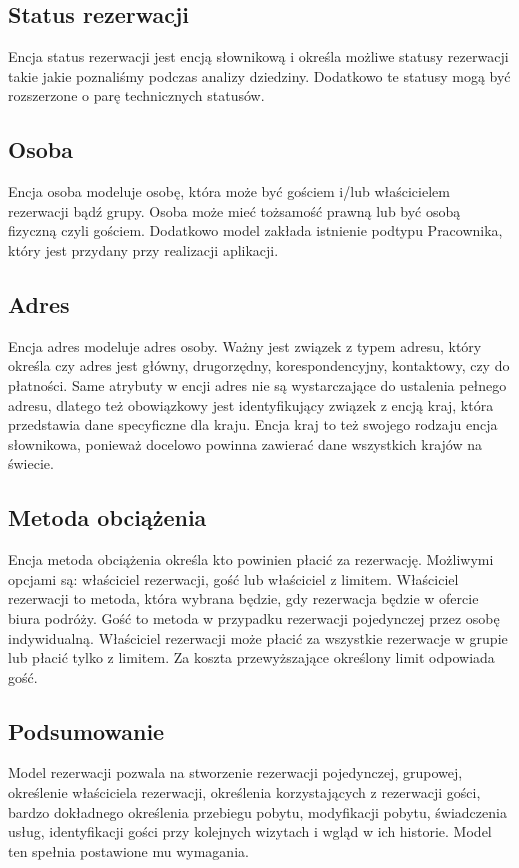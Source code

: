 \documentclass[a4paper,onecolumn,oneside,11pt,wide,floatssmall]{mwrep}
\theoremstyle{definition}
\theoremstyle{plain}%
\theoremstyle{remark}
\begin{document}
\subsection{Status rezerwacji}
Encja status rezerwacji jest encją słownikową i określa możliwe statusy rezerwacji takie jakie poznaliśmy podczas analizy dziedziny. Dodatkowo te statusy mogą być rozszerzone o parę technicznych statusów.

\subsection{Osoba}
Encja osoba modeluje osobę, która może być gościem i/lub właścicielem rezerwacji bądź grupy. Osoba może mieć tożsamość prawną lub być osobą fizyczną czyli gościem. Dodatkowo model zakłada istnienie podtypu Pracownika, który jest przydany przy realizacji aplikacji. 

\subsection{Adres}
Encja adres modeluje adres osoby. Ważny jest związek z typem adresu, który określa czy adres jest główny, drugorzędny, korespondencyjny, kontaktowy, czy do płatności. Same atrybuty w encji adres nie są wystarczające do ustalenia pełnego adresu, dlatego też obowiązkowy jest identyfikujący związek z encją kraj, która przedstawia dane specyficzne dla kraju. Encja kraj to też swojego rodzaju encja słownikowa, ponieważ docelowo powinna zawierać dane wszystkich krajów na świecie.

\subsection{Metoda obciążenia}
Encja metoda obciążenia określa kto powinien płacić za rezerwację. Możliwymi opcjami są: właściciel rezerwacji, gość lub właściciel z limitem. Właściciel rezerwacji to metoda, która wybrana będzie, gdy rezerwacja będzie w ofercie biura podróży. Gość to metoda w przypadku rezerwacji pojedynczej przez osobę indywidualną. Właściciel rezerwacji może płacić za wszystkie rezerwacje w grupie lub płacić tylko z limitem. Za koszta przewyższające określony limit odpowiada gość. 

\subsection{Podsumowanie}
Model rezerwacji pozwala na stworzenie rezerwacji pojedynczej, grupowej, określenie właściciela rezerwacji, określenia korzystających z rezerwacji gości, bardzo dokładnego określenia przebiegu pobytu, modyfikacji pobytu, świadczenia usług, identyfikacji gości przy kolejnych wizytach i wgląd w ich historie. Model ten spełnia postawione mu wymagania.
\end{document}
